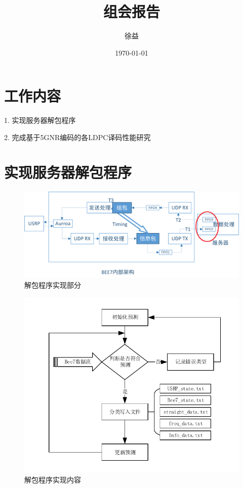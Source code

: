 \documentclass{article}
\title{组会报告}
\author{徐益}
\date{\today}
\begin{document}
\maketitle


\section{工作内容}

1. 实现服务器解包程序

2. 完成基于5GNR编码的各LDPC译码性能研究

\section{实现服务器解包程序}

\begin{figure}[H]
	\centering
	\includegraphics[width = .6\textwidth]{structure.png}
	\caption{解包程序实现部分}
\end{figure}

\begin{figure}[H]
	\centering
	\includegraphics[width = .6\textwidth]{depack.pdf}
	\caption{解包程序实现内容}
\end{figure}

\end{document}
